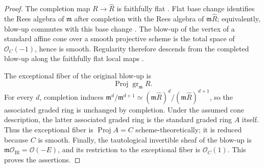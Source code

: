 \documentclass[11pt]{article}
\newcommand{\OO}{\mathcal O}
\newcommand{\Bl}{\operatorname{Bl}}
\begin{document}
\begin{proof}
The completion map $R\to\widehat R$ is faithfully flat
\cite[Lemma~10.97.3, Tag~00MC]{StacksCompletionFF}.  Flat base change identifies
the Rees algebra of $\mathfrak m$ after completion with the Rees algebra of
$\mathfrak m\widehat R$; equivalently, blow-up commutes with this base change
\cite[Lemma~31.33.3, Tag~0805]{StacksBlowup}.  The blow-up of the vertex of a
standard affine cone over a smooth projective scheme is the total space of
$\OO_C(-1)$, hence is smooth.  Regularity therefore descends from the completed
blow-up along the faithfully flat local maps
\cite[Lemma~10.164.4, Tag~07NG]{StacksRegularDescent}.

The exceptional fiber of the original blow-up is
\[
        \operatorname{Proj}\operatorname{gr}_{\mathfrak m}R.
\]
For every $d$, completion induces
$\mathfrak m^d/\mathfrak m^{d+1}\simeq
(\mathfrak m\widehat R)^d/(\mathfrak m\widehat R)^{d+1}$, so the associated
graded ring is unchanged by completion.  Under the assumed cone description,
the latter associated graded ring is the standard graded ring $A$ itself.
Thus the exceptional fiber is $\operatorname{Proj}A=C$ scheme-theoretically;
it is reduced because $C$ is smooth.  Finally, the tautological invertible sheaf
of the blow-up is $\mathfrak m\OO_{\Bl}=\OO(-E)$, and its restriction to the
exceptional fiber is $\OO_C(1)$.  This proves the assertions.
\end{proof}
\end{document}
